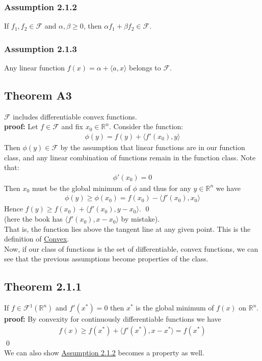 \documentclass[12pt,a4paper]{article}
\begin{document}
	\subsubsection*{Assumption 2.1.2}
	If $f_1, f_2 \in \mathcal{F}$ and $\alpha, \beta \geq 0$, then $\alpha f_1 + \beta f_2 \in \mathcal{F}$.
	\subsubsection*{Assumption 2.1.3}
	Any linear function $f(x) = \alpha + \langle a, x \rangle$ belongs to $\mathcal{F}$.
	
	\subsection*{Theorem A3}\label{thmA3}
	$\mathcal{F}$ includes differentiable convex functions.\\
	\textbf{proof:} Let $f \in \mathcal{F}$ and fix $x_0 \in \mathbb{R}^n$. Consider the function:
	\begin{align*}
		\phi(y) = f(y) + \langle f'(x_0), y \rangle 
	\end{align*}
	Then $\phi(y) \in \mathcal{F}$ by the assumption that linear functions are in our function class, and any linear combination of functions remain in the function class. Note that:
	\begin{align*}
		\phi'(x_0) = 0
	\end{align*}
	Then $x_0$ must be the global minimum of $\phi$ and thus for any $y \in \mathbb{R}^n$ we have
	\begin{align*}
		\phi(y) \geq \phi(x_0) = f(x_0) - \langle f'(x_0), x_0 \rangle 
	\end{align*}
	Hence $f(y) \geq f(x_0) + \langle f'(x_0), y - x_0 \rangle$. \qed \\
	(here the book has $\langle f'(x_0), x - x_0 \rangle$ by mistake).\\
	That is, the function lies above the tangent line at any given point. This is the definition of \hyperref[sec:Def]{Convex}. \\
	Now, if our class of functions is the set of differentiable, convex functions, we can see that the previous assumptions become properties of the class.
	\subsection*{Theorem 2.1.1}\label{thm211}
	If $f \in \mathcal{F}^1(\mathbb{R}^n)$ and $f'(x^*) = 0$ then $x^*$ is the global minimum of $f(x)$ on $\mathbb{R}^n$. \\
	\textbf{proof:} By convexity for continuously differentiable functions we have
	\begin{align*}
		f(x) \geq f(x^*) + \langle f'(x^*), x - x^* \rangle = f(x^*)
	\end{align*}
	\qed \\
	We can also show \hyperref[thmA3]{Assumption 2.1.2} becomes a property as well.
\end{document}

